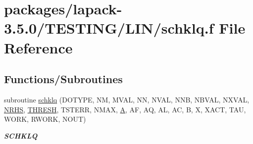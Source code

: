 \hypertarget{schklq_8f}{}\section{packages/lapack-\/3.5.0/\+T\+E\+S\+T\+I\+N\+G/\+L\+I\+N/schklq.f File Reference}
\label{schklq_8f}
\subsection*{Functions/\+Subroutines}
\begin{DoxyCompactItemize}
\item 
subroutine \hyperlink{group__single__lin_gaa8c61ad5245bb569b08f463ba28d0e68}{schklq} (D\+O\+T\+Y\+P\+E, N\+M, M\+V\+A\+L, N\+N, N\+V\+A\+L, N\+N\+B, N\+B\+V\+A\+L, N\+X\+V\+A\+L, \hyperlink{example__user_8c_aa0138da002ce2a90360df2f521eb3198}{N\+R\+H\+S}, \hyperlink{zlaqgs_8c_a0656018abfc9fa2821827415f5d5ea57}{T\+H\+R\+E\+S\+H}, T\+S\+T\+E\+R\+R, N\+M\+A\+X, \hyperlink{classA}{A}, A\+F, A\+Q, A\+L, A\+C, B, X, X\+A\+C\+T, T\+A\+U, W\+O\+R\+K, R\+W\+O\+R\+K, N\+O\+U\+T)
\begin{DoxyCompactList}\small\item\em {\bfseries S\+C\+H\+K\+L\+Q} \end{DoxyCompactList}\end{DoxyCompactItemize}
